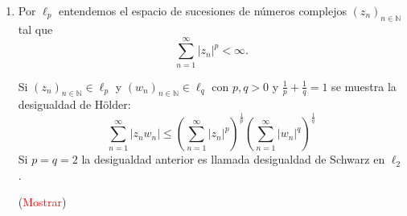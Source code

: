 \documentclass[twoside,12pt,a4 paper,openright]{book}
\begin{document}
\begin{enumerate}
    \item Por $\ell_p$ entendemos el espacio  de sucesiones de n\'umeros complejos $(z_n)_{n\in \mathbb N}$ tal que 
    \begin{equation*}
        \sum_{n=1}^{ \infty} |z_n|^{p} < \infty.
    \end{equation*}

    Si $(z_n)_{n\in \mathbb N} \in \ell_p$ y $(w_n)_{n\in \mathbb N} \in \ell_q$ con $p,q>0$ y $\frac{1}{p}+ \frac{1}{q} =1$  se muestra la desigualdad de  H\"older: 
    \begin{equation*}
        \sum_{n=1}^{ \infty} |z_n w_n|  \leq   \left( 
        \sum_{n=1}^{ \infty} |z_n|^{p}
        \right) ^{\frac{1}{p}}\left(  \sum_{n=1}^{ \infty} |w_n|^{q}  \right) ^{\frac{1}{q}}
    \end{equation*}
    Si $p=q=2$ la desigualdad anterior es llamada desigualdad de Schwarz en $\ell_2$.

    (\textcolor{red}{Mostrar})


\end{enumerate}
\end{document}
